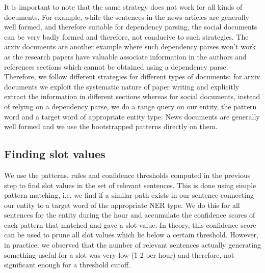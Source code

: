 \begin{itemize}
It is important to note that the same strategy does not work for all kinds of documents. For example, while the sentences in the news articles are generally well formed, and therefore suitable for dependency parsing, the social documents can be very badly formed and therefore, not conducive to such strategies. The arxiv documents are another example where such dependency parses won’t work as the research papers have valuable associate information in the authors and references sections which cannot be obtained using a dependency parse. Therefore, we follow different strategies for different types of documents: for arxiv documents we exploit the systematic nature of paper writing and explicitly extract the information in different sections whereas for social documents, instead of relying on a dependency parse, we do a range query on our entity, the pattern word and a target word of appropriate entity type. News documents are generally well formed and we use the bootstrapped patterns directly on them.
\end{itemize}

\subsection{Finding slot values}
We use the patterns, rules and confidence thresholds computed in the previous step to find slot values in the set of relevant sentences. This is done using simple pattern matching, i.e. we find if a similar path exists in our sentence connecting our entity to a target word of the appropriate NER type. We do this for all sentences for the entity during the hour and accumulate the confidence scores of each pattern that matched and gave a slot value. In theory, this confidence score can be used to prune all slot values which lie below a certain threshold. However, in practice, we observed that the number of relevant sentences actually generating something useful for a slot was very low (\~1-2 per hour) and therefore, not significant enough for a threshold cutoff.

